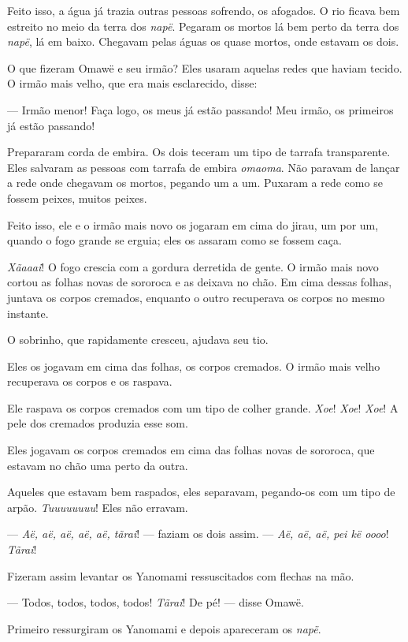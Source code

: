 Feito isso, a água já trazia outras pessoas sofrendo, os afogados. O rio ficava bem estreito no meio da terra dos \textit{napë}. Pegaram os
mortos lá bem perto da terra dos \textit{napë}, lá em baixo. Chegavam
pelas águas os quase mortos, onde estavam os dois. 

O que fizeram Omawë e seu irmão? Eles usaram aquelas redes que haviam
tecido. O irmão mais velho, que era mais esclarecido, disse: 

--- Irmão menor! Faça logo, os meus já estão passando! Meu irmão, os
primeiros já estão passando! 

Prepararam corda de embira. Os dois teceram um tipo de tarrafa transparente.
Eles salvaram as pessoas com tarrafa de embira \textit{omaoma}. Não paravam de
lançar a rede onde chegavam os mortos, pegando um a um. Puxaram a rede
como se fossem peixes, muitos peixes. 

Feito isso, ele e o irmão mais novo os jogaram em cima do jirau, um por
um, quando o fogo grande se erguia; eles os assaram como se fossem
caça. 

\textit{Xãaaai}! O fogo crescia com a gordura derretida de gente. O irmão
mais novo cortou as folhas novas de sororoca e as deixava no chão. Em
cima dessas folhas, juntava os corpos cremados, enquanto o outro
recuperava os corpos no mesmo instante. 

O sobrinho, que rapidamente cresceu, ajudava seu tio. 

Eles os jogavam em cima das folhas, os corpos cremados. O irmão mais
velho recuperava os corpos e os raspava. 

Ele raspava os corpos cremados com um tipo de colher grande. \textit{Xoe}! \textit{Xoe}!
\textit{Xoe}! A pele dos cremados produzia esse som. 

Eles jogavam os corpos cremados em cima das folhas novas de sororoca,
que estavam no chão uma perto da outra. 

Aqueles que estavam bem raspados, eles separavam, pegando-os com um
tipo de arpão. \textit{Tuuuuuuuu}! Eles não erravam. 

--- \textit{Aë, aë, aë, aë, aë, tãrai}! --- faziam os dois assim. --- \textit{Aë, aë, aë,
pei kë oooo}! \textit{Tãrai}! 

Fizeram assim levantar os Yanomami ressuscitados com flechas na mão. 

--- Todos, todos, todos, todos! \textit{Tãrai}! De pé! --- disse Omawë.

Primeiro ressurgiram os Yanomami e depois apareceram os \textit{napë}. 

